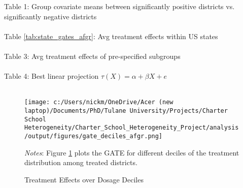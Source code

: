 \documentclass{article} %
\begin{document}
	

Table 1: Group covariate means between significantly positive districts vs. significantly negative districts\\
\\

Table \ref{tab:state_gates_afgr}: Avg treatment effects within US states\\
\\


Table 3: Avg treatment effects of pre-specified subgroups\\
\\

Table 4: Best linear projection $\tau(X) = \alpha + \beta X + e$\\
\\

\begin{figure}[!h]
\centering
\texttt{[image: c:/Users/nickm/OneDrive/Acer (new laptop)/Documents/PhD/Tulane University/Projects/Charter School Heterogeneity/Charter\_School\_Heterogeneity\_Project/analysis/output/figures/gate\_deciles\_afgr.png]}
\caption{Treatment Effects over Dosage Deciles}
\label{fig:dosage_afgr}
\begin{minipage}{1\linewidth}
\singlespacing
\footnotesize
\emph{Notes}: Figure \ref{fig:dosage_afgr} plots the GATE for different deciles of the treatment distribution among treated districts.
\end{minipage}
\end{figure}
\end{document}
